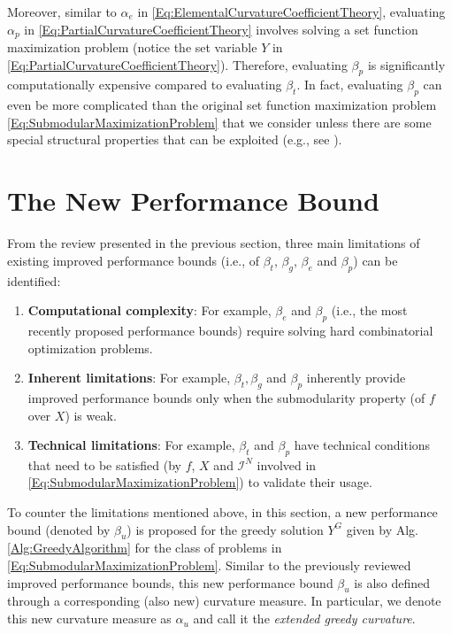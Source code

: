 \documentclass[conference]{IEEEtran}
\begin{document}
Moreover, similar to $\alpha_e$ in \eqref{Eq:ElementalCurvatureCoefficientTheory}, evaluating $\alpha_p$ in \eqref{Eq:PartialCurvatureCoefficientTheory} involves solving a set function maximization problem (notice the set variable $Y$ in \eqref{Eq:PartialCurvatureCoefficientTheory}). Therefore, evaluating $\beta_p$ is significantly computationally expensive compared to evaluating $\beta_t$. In fact, evaluating $\beta_p$ can even be more complicated than the original set function maximization problem \eqref{Eq:SubmodularMaximizationProblem} that we consider unless there are some special structural properties that can be exploited (e.g., see \cite[Ch. 3.2.4]{Welikala2021Thesis}).





\section{The New Performance Bound}
\label{Sec:NewPerformanceBound}


From the review presented in the previous section, three main limitations of existing improved performance bounds (i.e., of $\beta_t$\cite{Conforti1984}, $\beta_g$\cite{Conforti1984}, $\beta_e$\cite{Wang2016} and $\beta_p$\cite{Liu2018}) can be identified: 
\begin{enumerate}
    \item \textbf{Computational complexity}: For example, $\beta_e$ and $\beta_p$ (i.e., the most recently proposed performance bounds) require solving hard combinatorial optimization problems. 
    \item \textbf{Inherent limitations}: For example, $\beta_t, \beta_g$ and $\beta_p$ inherently provide improved performance bounds only when the submodularity property (of $f$ over $X$) is weak.
    \item \textbf{Technical limitations}: For example, $\beta_t$ and $\beta_p$ have technical conditions that need to be satisfied (by $f$, $X$ and $\mathcal{I}^N$ involved in \eqref{Eq:SubmodularMaximizationProblem}) to validate their usage.
\end{enumerate}


To counter the limitations mentioned above, in this section, a new performance bound (denoted by $\beta_u$) is proposed for the greedy solution $Y^G$ given by Alg. \ref{Alg:GreedyAlgorithm} for the class of problems in \eqref{Eq:SubmodularMaximizationProblem}. Similar to the previously reviewed improved performance bounds, this new performance bound $\beta_u$ is also defined through a corresponding (also new) curvature measure. In particular, we denote this new curvature measure as $\alpha_u$ and call it the \emph{extended greedy curvature}.
\end{document}
